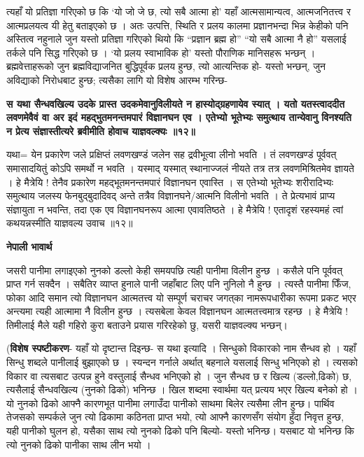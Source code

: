\documentclass[11pt, a5paper]{article}
\begin{document}
त्यहाँ यो प्रतिज्ञा गरिएको छ कि ‘यो जो जे छ, त्यो सबै आत्मा हो’ यहाँ आत्मसामान्यत्व, आत्मजनितत्त्व र आत्मप्रलयत्व यी हेतु बताइएको छ । अतः उत्पत्ति, स्थिति र प्रलय कालमा प्रज्ञानभन्दा भिन्न केहीको पनि अस्तित्व नहुनाले जुन यस्तो प्रतिज्ञा गरिएको थियो कि “प्रज्ञान ब्रह्म हो” “यो सबै आत्मा नै हो” यसलाई तर्कले पनि सिद्ध गरिएको छ । ‘यो प्रलय स्वाभाविक हो’ यस्तो पौराणिक मानिसहरू भन्छन् । ब्रह्मवेत्ताहरूको जुन ब्रह्मविद्याजनित बुद्धिपूर्वक प्रलय हुन्छ, त्यो आत्यन्तिक हो- यस्तो भन्छन्, जुन अविद्याको निरोधबाट हुन्छ; त्यसैका लागि यो विशेष आरम्भ गरिन्छ-

\textbf{स यथा  सैन्धवखिल्य उदके प्रास्त उदकमेवानुविलीयते न हास्योद्‍ग्रहणायेव स्यात् । यतो यतस्त्वाददीत लवणमेवैवं वा अर इदं महद्‍भुतमनन्तमपारं विज्ञानघन एव । एतेभ्यो भूतेभ्यः समुत्थाय तान्येवानु विनश्यति न प्रेत्य संज्ञास्तीत्यरे ब्रवीमीति होवाच याज्ञवल्क्यः ॥१२॥}

यथा= येन प्रकारेण जले प्रक्षिप्तं लवणखण्डं जलेन सह द्रवीभूत्वा लीनो भवति । तं लवणखण्डं पूर्ववत् समासादयितुं कोऽपि समर्थो न भवति । यस्माद् यस्मात् स्थानाज्जलं नीयते तत्र तत्र लवणमिश्रितमेव ज्ञायते । हे मैत्रेयि ! तेनैव प्रकारेण महद्‌भूतमनन्तमपारं विज्ञानघन एवास्ति । स एतेभ्यो भूतेभ्यः शरीरादिभ्यः समुत्थाय जलस्य फेनबुद्‌बुदादिवद् अन्ते तत्रैव विज्ञानघने/आत्मनि विलीनो भवति । ते प्रेत्यभावं प्राप्य संज्ञायुता न भवन्ति, तदा एक एव विज्ञानघनरूप आत्मा एवावतिष्ठते । हे मैत्रेयि ! एतादृशं रहस्यमहं त्वां कथयन्नस्मीति याज्ञवल्य उवाच ॥१२॥

\textbf{नेपाली भावार्थ}

जसरी पानीमा लगाइएको नुनको डल्लो केही समयपछि त्यही पानीमा विलीन हुन्छ । कसैले पनि पूर्ववत् प्राप्त गर्न सक्दैन । सबैतिर व्याप्त हुनाले पानी जहाँबाट लिए पनि नुनिलो नै हुन्छ । त्यस्तै पानीमा फिँज, फोका आदि समान त्यो विज्ञानघन आत्मतत्त्व यो सम्पूर्ण चराचर जगत्‌का नामरूपधारीका रूपमा प्रकट भएर अन्त्यमा त्यही आत्मामा नै विलीन हुन्छ । त्यसबेला केवल विज्ञानघन आत्मतत्त्वमात्र रहन्छ । हे मैत्रेयि ! तिमीलाई मैले यही गहिरो कुरा बताउने प्रयास गरिरहेको छु, यसरी याज्ञवल्क्य भन्छन्।

(\textbf{विशेष स्पष्टीकरण}- यहाँ यो दृष्टान्त दिइन्छ- स यथा इत्यादि । सिन्धुको विकारको नाम सैन्धव हो । यहाँ सिन्धु शब्दले पानीलाई बुझाएको छ । स्यन्दन गर्नाले अर्थात् बहनाले यसलाई सिन्धु भनिएको हो । त्यसको विकार वा त्यसबाट उत्पन्न हुने वस्तुलाई सैन्धव भनिएको हो । जुन सैन्धव छ र खिल्य (डल्लो,ढिको) छ, त्यसैलाई सैन्धवखिल्य (नुनको ढिको) भनिन्छ । खिल शब्दमा स्वार्थमा यत् प्रत्यय भएर खिल्य बनेको हो । यो नुनको ढिको आफ्नै कारणभूत पानीमा लगाउँदा पानीको साथमा बिलेर त्यसैमा लीन हुन्छ। पार्थिव तेजसको सम्पर्कले जुन त्यो ढिकामा कठिनता प्राप्त भयो, त्यो आफ्नै कारणसँग संयोग हुँदा निवृत्त हुन्छ, यही पानीको घुलन हो, यसैका साथ त्यो नुनको ढिको पनि बिल्यो- यस्तो भनिन्छ। यसबाट यो भनिन्छ कि त्यो नुनको ढिको पानीका साथ लीन भयो ।
\end{document}
